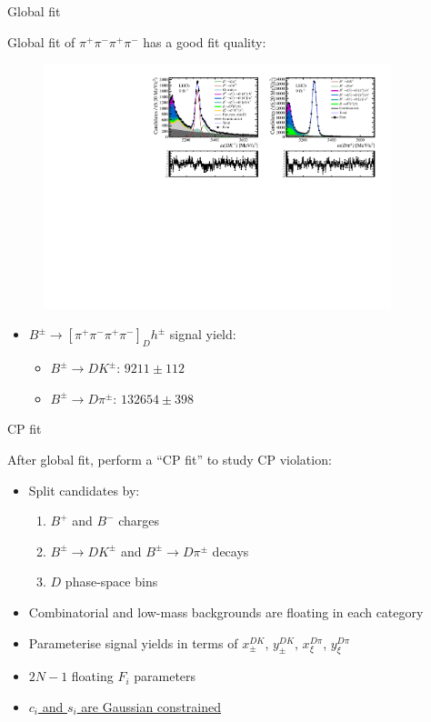 \documentclass[xcolor={dvipsnames}]{beamer}
\begin{document}
\begin{frame}{Global fit}
  \begin{center}
    {\large Global fit of $\pi^+\pi^-\pi^+\pi^-$ has a good fit quality:}
  \end{center}
  \vspace{-0.5cm}
  \begin{figure}
    \centering
    \includegraphics[width = 0.9\textwidth,trim={0 0 0 0},clip=true]{Plots/d2pipipipi_fiveL_allDP.pdf}
  \end{figure}
  \vspace{-0.5cm}
  \begin{itemize}
    \item{$B^\pm\to[\pi^+\pi^-\pi^+\pi^-]_Dh^\pm$ signal yield:}
    \begin{itemize}
      \item{$B^\pm\to DK^\pm$: $9211 \pm 112$}
      \item{$B^\pm\to D\pi^\pm$: $132654 \pm 398$}
    \end{itemize}
  \end{itemize}
\end{frame}

\begin{frame}{CP fit}
  \begin{center}
    {\large After global fit, perform a ``CP fit'' to study CP violation:}
  \end{center}
  \begin{itemize}
    \setlength\itemsep{1.0em}
    \item{Split candidates by:}
    \begin{enumerate}
      \item{$B^+$ and $B^-$ charges}
      \item{$B^\pm\to DK^\pm$ and $B^\pm\to D\pi^\pm$ decays}
      \item{$D$ phase-space bins}
    \end{enumerate}
    \item{Combinatorial and low-mass backgrounds are floating in each category}
    \item{Parameterise signal yields in terms of $x_\pm^{DK}$, $y_\pm^{DK}$, $x_\xi^{D\pi}$, $y_\xi^{D\pi}$}
    \item{$2N - 1$ floating $F_i$ parameters}
    \item{\underline{$c_i$ and $s_i$ are Gaussian constrained}}
  \end{itemize}
\end{frame}
\end{document}

